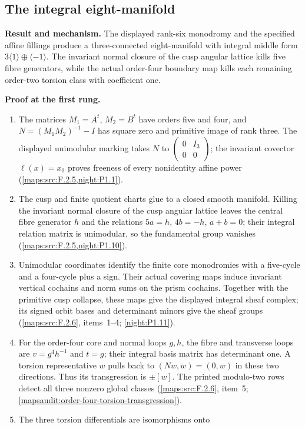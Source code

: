 \documentclass[11pt,a4paper]{article}
\theoremstyle{definition}
\newcommand{\RungZero}[1]{\par\noindent\textbf{Result and mechanism.} #1\par\smallskip}
\newcommand{\RungOne}{\par\Needspace{6\baselineskip}\noindent\textbf{Proof at the first rung.}\par\nobreak\smallskip}
\begin{document}
\subsection{The integral eight-manifold}
\RungZero{The displayed rank-six monodromy and the specified affine
fillings produce a three-connected eight-manifold with integral middle
form $3\langle1\rangle\oplus\langle-1\rangle$.  The invariant normal closure of the cusp angular lattice
kills five fibre generators, while the actual order-four boundary
map kills each remaining order-two torsion class with coefficient one.}
\RungOne
\begin{enumerate}[label=\arabic*.]
\item The matrices $M_1=A^t$, $M_2=B^t$ have orders five and four, and
  $N=(M_1M_2)^{-1}-I$ has square zero and primitive image of rank three.
  The displayed unimodular marking takes $N$ to
  $\left(\begin{smallmatrix}0&I_3\\0&0\end{smallmatrix}\right)$;
  the invariant covector $\ell(x)=x_0$ proves freeness of every
  nonidentity affine power
  (\cref{maps:src:F.2.5,night:P1.1}).
\item The cusp and finite quotient charts glue to a closed smooth
  manifold.  Killing the invariant normal closure of the cusp angular lattice
  leaves the central fibre generator $h$ and the relations $5a=h$, $4b=-h$, $a+b=0$;
  their integral relation matrix is unimodular, so the fundamental
  group vanishes (\cref{maps:src:F.2.5,night:P1.10}).
\item Unimodular coordinates identify the finite core monodromies
  with a five-cycle and a four-cycle plus a sign.  Their actual
  covering maps induce invariant vertical cochains and norm sums
  on the prism cochains.  Together with the primitive cusp collapse,
  these maps give the displayed integral sheaf complex; its signed
  orbit bases and determinant minors give the sheaf groups
  (\cref{maps:src:F.2.6}, items~1--4; \cref{night:P1.11}).
\item For the order-four core and normal loops $g,h$, the fibre and
  transverse loops are $v=g^4h^{-1}$ and $t=g$; their integral
  basis matrix has determinant one.  A torsion representative $w$
  pulls back to $(Nw,w)=(0,w)$ in these two directions.
  Thus its transgression is $\pm[w]$.  The printed modulo-two
  rows detect all three nonzero global classes
  (\cref{maps:src:F.2.6}, item~5;
  \cref{mapsaudit:order-four-torsion-transgression}).
\item The three torsion differentials are isomorphisms onto

\end{enumerate}
\end{document}
